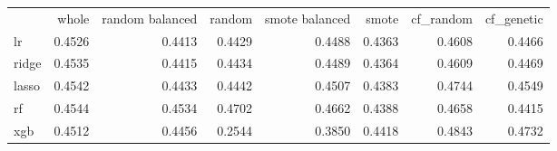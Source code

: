 \begin{tabular}{lrrrrrrr}
 & whole & random balanced & random & smote balanced & smote & cf_random & cf_genetic \\
lr & 0.4526 & 0.4413 & 0.4429 & 0.4488 & 0.4363 & 0.4608 & 0.4466 \\
ridge & 0.4535 & 0.4415 & 0.4434 & 0.4489 & 0.4364 & 0.4609 & 0.4469 \\
lasso & 0.4542 & 0.4433 & 0.4442 & 0.4507 & 0.4383 & 0.4744 & 0.4549 \\
rf & 0.4544 & 0.4534 & 0.4702 & 0.4662 & 0.4388 & 0.4658 & 0.4415 \\
xgb & 0.4512 & 0.4456 & 0.2544 & 0.3850 & 0.4418 & 0.4843 & 0.4732 \\
\end{tabular}

